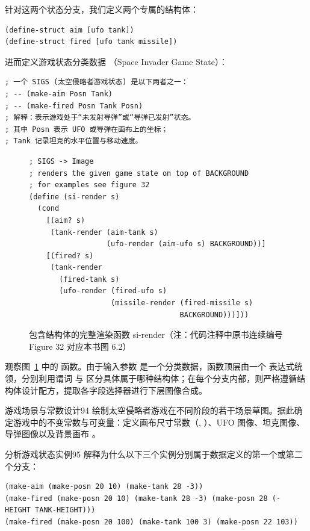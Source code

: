 针对这两个状态分支，我们定义两个专属的结构体：

\begin{lstlisting}[language=BSL]
(define-struct aim [ufo tank])
(define-struct fired [ufo tank missile])
\end{lstlisting}

进而定义游戏状态分类数据 （Space Invader Game State）：

\begin{lstlisting}[language=BSL]
; 一个 SIGS (太空侵略者游戏状态) 是以下两者之一：
; -- (make-aim Posn Tank)
; -- (make-fired Posn Tank Posn)
; 解释：表示游戏处于“未发射导弹”或“导弹已发射”状态。
; 其中 Posn 表示 UFO 或导弹在画布上的坐标；
; Tank 记录坦克的水平位置与移动速度。
\end{lstlisting}

\begin{figure}[htbp]
  \centering
\begin{lstlisting}[language=BSL, basicstyle=\scriptsize\ttfamily]
; SIGS -> Image
; renders the given game state on top of BACKGROUND
; for examples see figure 32
(define (si-render s)
  (cond
    [(aim? s)
     (tank-render (aim-tank s)
                  (ufo-render (aim-ufo s) BACKGROUND))]
    [(fired? s)
     (tank-render
       (fired-tank s)
       (ufo-render (fired-ufo s)
                   (missile-render (fired-missile s)
                                   BACKGROUND)))]))
\end{lstlisting}
  \caption{包含结构体的完整渲染函数 si-render（注：代码注释中原书连续编号 Figure 32 对应本书图 6.2）}
  \label{fig:sigs_render_full}
\end{figure}

观察图~\ref{fig:sigs_render_full} 中的  函数。由于输入参数  是一个分类数据，函数顶层由一个  表达式统领，分别利用谓词  与  区分具体属于哪种结构体；在每个分支内部，则严格遵循结构体设计配方，提取各字段选择器进行下层图像合成。

\begin{exercise}{游戏场景与常数设计}{94}
绘制太空侵略者游戏在不同阶段的若干场景草图。据此确定游戏中的不变常数与可变量：定义画布尺寸常数（, ）、UFO 图像、坦克图像、导弹图像以及背景画布 。
\end{exercise}

\begin{exercise}{分析游戏状态实例}{95}
解释为什么以下三个实例分别属于数据定义的第一个或第二个分支：
\begin{lstlisting}[language=BSL]
(make-aim (make-posn 20 10) (make-tank 28 -3))
(make-fired (make-posn 20 10) (make-tank 28 -3) (make-posn 28 (- HEIGHT TANK-HEIGHT)))
(make-fired (make-posn 20 100) (make-tank 100 3) (make-posn 22 103))
\end{lstlisting}
\end{exercise}

